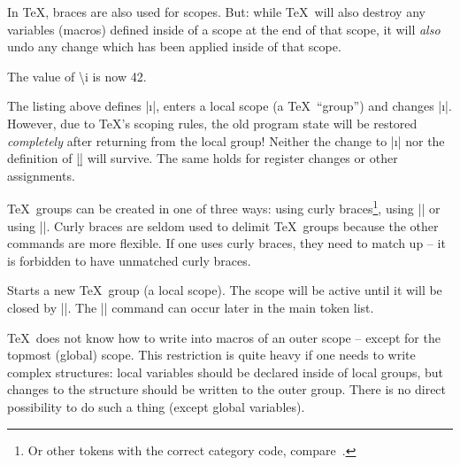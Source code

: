 \documentclass[a4paper,doc2]{ltxdoc}
\begin{document}
In \TeX, braces are also used for scopes. But: while \TeX\ will also destroy any variables (macros) defined inside of a scope at the end of that scope, it will \emph{also} undo any change which has been applied inside of that scope.
\begin{codeexample}[]
\def\i{42}
{
	\def\i{43}
	\def\b{2}
}
The value of \textbackslash i is now \i.
\end{codeexample}
\noindent The listing above defines |\i|, enters a local scope (a \TeX\ ``group'') and changes |\i|. However, due to \TeX's scoping rules, the old program state will be restored \emph{completely} after returning from the local group! Neither the change to |\i| nor the definition of |\b| will survive. The same holds for register changes or other assignments.

\TeX\ groups can be created in one of three ways: using curly braces\footnote{Or other tokens with the correct category code, compare~\cite{texbook}.}, using |\begingroup| or using |\bgroup|. Curly braces are seldom used to delimit \TeX\ groups because the other commands are more flexible. If one uses curly braces, they need to match up -- it is forbidden to have unmatched curly braces.
\begin{command}{\begingroup}
	Starts a new \TeX\ group (a local scope). The scope will be active until it will be closed by |\endgroup|. The |\endgroup| command can occur later in the main token list.
\end{command}

\TeX\ does not know how to write into macros of an outer scope -- except for the topmost (global) scope. This restriction is quite heavy if one needs to write complex structures: local variables should be declared inside of local groups, but changes to the structure should be written to the outer group. There is no direct possibility to do such a thing (except global variables).
\end{document}
